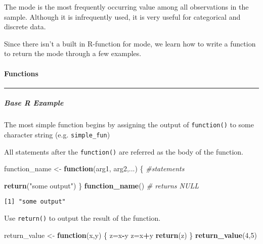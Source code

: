 \documentclass[12pt,]{article}
\newenvironment{Shaded}{\begin{snugshade}}{\end{snugshade}}
\newcommand{\CommentTok}[1]{\textcolor[rgb]{0.56,0.35,0.01}{\textit{#1}}}
\newcommand{\ControlFlowTok}[1]{\textcolor[rgb]{0.13,0.29,0.53}{\textbf{#1}}}
\newcommand{\DecValTok}[1]{\textcolor[rgb]{0.00,0.00,0.81}{#1}}
\newcommand{\KeywordTok}[1]{\textcolor[rgb]{0.13,0.29,0.53}{\textbf{#1}}}
\newcommand{\NormalTok}[1]{#1}
\newcommand{\OperatorTok}[1]{\textcolor[rgb]{0.81,0.36,0.00}{\textbf{#1}}}
\newcommand{\StringTok}[1]{\textcolor[rgb]{0.31,0.60,0.02}{#1}}
\let\oldparagraph\paragraph
\renewcommand{\paragraph}[1]{\oldparagraph{#1}\mbox{}}
\let\oldsubparagraph\subparagraph
\renewcommand{\subparagraph}[1]{\oldsubparagraph{#1}\mbox{}}
\begin{document}
The mode is the most frequently occurring value among all observations
in the sample. Although it is infrequently used, it is very useful for
categorical and discrete data.

Since there isn't a built in R-function for mode, we learn how to write
a function to return the mode through a few examples.

\hypertarget{functions}{%
\paragraph{Functions}\label{functions}}

\begin{center}\rule{0.5\linewidth}{\linethickness}\end{center}

\hypertarget{base-r-example}{%
\subparagraph{Base R Example}\label{base-r-example}}

The most simple function begins by assigning the output of
\texttt{function()} to some character string (e.g. \texttt{simple\_fun})

All statements after the \texttt{function()} are referred as the body of
the function.

\begin{Shaded}
\begin{Highlighting}[]
\NormalTok{function_name <-}\StringTok{ }\ControlFlowTok{function}\NormalTok{(arg1, arg2,...) \{}
  \CommentTok{#statements}
  
  \KeywordTok{return}\NormalTok{(}\StringTok{"some output"}\NormalTok{)}
\NormalTok{\}}
\KeywordTok{function_name}\NormalTok{() }\CommentTok{# returns NULL}
\end{Highlighting}
\end{Shaded}

\begin{verbatim}
[1] "some output"
\end{verbatim}

Use \texttt{return()} to output the result of the function.

\begin{Shaded}
\begin{Highlighting}[]
\NormalTok{return_value <-}\StringTok{ }\ControlFlowTok{function}\NormalTok{(x,y) \{}
\NormalTok{  z=x}\OperatorTok{-}\NormalTok{y  }
\NormalTok{  z=x}\OperatorTok{+}\NormalTok{y}
  \KeywordTok{return}\NormalTok{(z)}
\NormalTok{\}}
\KeywordTok{return_value}\NormalTok{(}\DecValTok{4}\NormalTok{,}\DecValTok{5}\NormalTok{) }
\end{Highlighting}
\end{Shaded}
\end{document}
